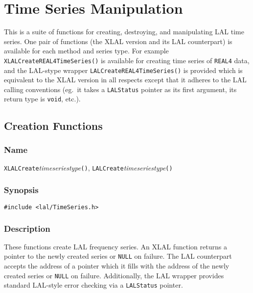 \clearpage
\section{Time Series Manipulation}
\label{s:TimeSeriesManipulation}

This is a suite of functions for creating, destroying, and manipulating LAL
time series.  One pair of functions (the XLAL version and its LAL
counterpart) is available for each method and series type.  For example
\texttt{XLALCreateREAL4TimeSeries()} is available for creating time series
of \texttt{REAL4} data, and the LAL-stype wrapper
\texttt{LALCreateREAL4TimeSeries()} is provided which is equivalent to the
XLAL version in all respects except that it adheres to the LAL calling
conventions (eg.\ it takes a \texttt{LALStatus} pointer as its first
argument, its return type is \texttt{void}, etc.).

\subsection{Creation Functions}

\subsubsection{Name}

\texttt{XLALCreate}\textit{timeseriestype}\texttt{()},
\texttt{LALCreate}\textit{timeseriestype}\texttt{()}

\subsubsection{Synopsis}

\begin{verbatim}
#include <lal/TimeSeries.h>
\end{verbatim}


\subsubsection{Description}

These functions create LAL frequency series.  An XLAL function returns a
pointer to the newly created series or \texttt{NULL} on failure.  The LAL
counterpart accepts the address of a pointer which it fills with the
address of the newly created series or \texttt{NULL} on failure.
Additionally, the LAL wrapper provides standard LAL-style error checking
via a \texttt{LALStatus} pointer.

